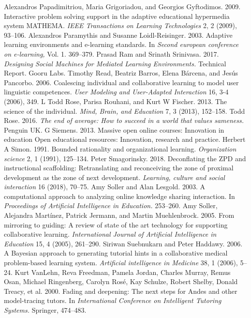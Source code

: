 \begin{multicols}{2}
\begin{thebibliography}{99}
 Alexandros Papadimitriou, Maria Grigoriadou, and Georgios Gyftodimos. 2009. Interactive problem solving support in the adaptive educational hypermedia system MATHEMA. \textit{IEEE Transactions on Learning Technologies} 2, 2 (2009), 93–106.
 Alexandros Paramythis and Susanne Loidl-Reisinger. 2003. Adaptive learning environments and e-learning standards. In \textit{Second european conference on e-learning,} Vol. 1. 369–379.
 Prasad Ram and Srinath Srinivasa. 2017. \textit{Designing Social Machines for Mediated Learning Environments.} Technical Report. Gooru Labs.
 Timothy Read, Beatriz Barros, Elena Bárcena, and Jesús Pancorbo. 2006. Coalescing individual and collaborative learning to model user linguistic competences. \textit{User Modeling and User-Adapted Interaction} 16, 3-4 (2006), 349.
 L Todd Rose, Parisa Rouhani, and Kurt W Fischer. 2013. The science of the individual. \textit{Mind, Brain, and Education} 7, 3 (2013), 152–158.
 Todd Rose. 2016. \textit{The end of average: How to succeed in a world that values sameness.} Penguin UK.
 G Siemens. 2013. Massive open online courses: Innovation in education Open educational resources: Innovation, research and practice.
 Herbert A Simon. 1991. Bounded rationality and organizational learning. \textit{Organization science} 2, 1 (1991), 125–134.
 Peter Smagorinsky. 2018. Deconflating the ZPD and instructional scaffolding: Retranslating and reconceiving the zone of proximal development as the zone of next development. \textit{Learning, culture and social interaction} 16 (2018), 70–75.
 Amy Soller and Alan Lesgold. 2003. A computational approach to analyzing online knowledge sharing interaction. In \textit{Proceedings of Artificial Intelligence in Education.} 253–260.
 Amy Soller, Alejandra Martínez, Patrick Jermann, and Martin Muehlenbrock. 2005. From mirroring to guiding: A review of state of the art technology for supporting collaborative learning. \textit{International Journal of Artificial Intelligence in Education} 15, 4 (2005), 261–290.
 Siriwan Suebnukarn and Peter Haddawy. 2006. A Bayesian approach to generating tutorial hints in a collaborative medical problem-based learning system. \textit{Artificial intelligence in Medicine} 38, 1 (2006), 5–24.
 Kurt VanLehn, Reva Freedman, Pamela Jordan, Charles Murray, Remus Osan, Michael Ringenberg, Carolyn Rosé, Kay Schulze, Robert Shelby, Donald Treacy, et al. 2000. Fading and deepening: The next steps for Andes and other model-tracing tutors. In \textit{International Conference on Intelligent Tutoring Systems.} Springer, 474–483.

\end{thebibliography}
\end{multicols}

